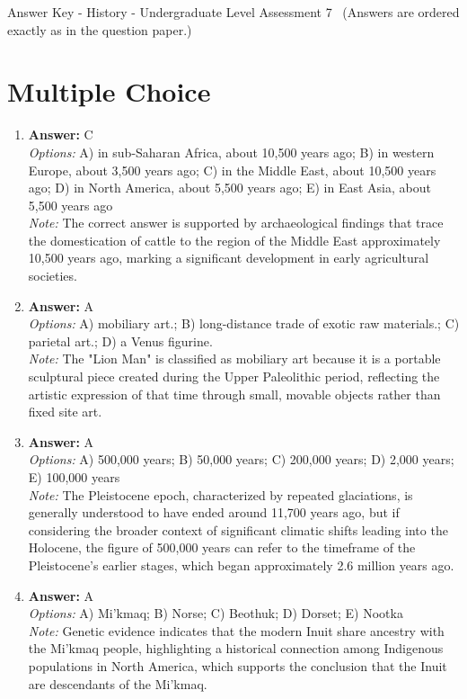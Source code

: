 \documentclass[12pt]{article}
\begin{document}
\begin{center}
Answer Key - History - Undergraduate Level Assessment 7 \
\small (Answers are ordered exactly as in the question paper.)
\end{center}

\section*{Multiple Choice}
\begin{enumerate}[label=\arabic*.]
\item \textbf{Answer:} C
\\ \textit{Options:} A) in sub-Saharan Africa, about 10,500 years ago; B) in western Europe, about 3,500 years ago; C) in the Middle East, about 10,500 years ago; D) in North America, about 5,500 years ago; E) in East Asia, about 5,500 years ago
\\ \textit{Note:} The correct answer is supported by archaeological findings that trace the domestication of cattle to the region of the Middle East approximately 10,500 years ago, marking a significant development in early agricultural societies.
\item \textbf{Answer:} A
\\ \textit{Options:} A) mobiliary art.; B) long-distance trade of exotic raw materials.; C) parietal art.; D) a Venus figurine.
\\ \textit{Note:} The "Lion Man" is classified as mobiliary art because it is a portable sculptural piece created during the Upper Paleolithic period, reflecting the artistic expression of that time through small, movable objects rather than fixed site art.
\item \textbf{Answer:} A
\\ \textit{Options:} A) 500,000 years; B) 50,000 years; C) 200,000 years; D) 2,000 years; E) 100,000 years
\\ \textit{Note:} The Pleistocene epoch, characterized by repeated glaciations, is generally understood to have ended around 11,700 years ago, but if considering the broader context of significant climatic shifts leading into the Holocene, the figure of 500,000 years can refer to the timeframe of the Pleistocene's earlier stages, which began approximately 2.6 million years ago.
\item \textbf{Answer:} A
\\ \textit{Options:} A) Mi'kmaq; B) Norse; C) Beothuk; D) Dorset; E) Nootka
\\ \textit{Note:} Genetic evidence indicates that the modern Inuit share ancestry with the Mi'kmaq people, highlighting a historical connection among Indigenous populations in North America, which supports the conclusion that the Inuit are descendants of the Mi'kmaq.

\end{enumerate}
\end{document}
